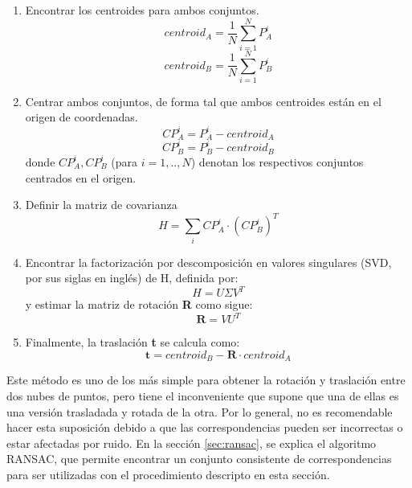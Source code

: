 \begin{enumerate}

\item Encontrar los centroides para ambos conjuntos.
\begin{equation}
centroid_{A} = \frac{1}{N} \sum_{i = 1}^{N} P_{A}^{i}
\end{equation}
\begin{equation}
centroid_{B} = \frac{1}{N} \sum_{i = 1}^{N} P_{B}^{i}
\end{equation}

\item Centrar ambos conjuntos, de forma tal que ambos centroides están en el origen de coordenadas.
\begin{equation}
CP_{A}^{i} = P_{A}^{i} - centroid_{A}
\end{equation}
\begin{equation}
CP_{B}^{i} = P_{B}^{i} - centroid_{B}
\end{equation}
donde $CP_{A}^{i}, CP_{B}^{i}$ (para $i=1,..,N$) denotan los respectivos conjuntos centrados en el origen.

\item Definir la matriz de covarianza
\begin{equation}
H = \sum_{i} CP_{A}^{i} \cdot (CP_{B}^{i})^{T}
\end{equation}

\item Encontrar la factorización por descomposición en valores singulares (SVD, por sus siglas en inglés) \cite{wiki-svd} de H, definida por:
\begin{equation}
H = U \Sigma V^{T}
\end{equation}
y estimar la matriz de rotación \textbf{R} como sigue:
\begin{equation}
\textbf{R} = V U^{T}
\end{equation}

\item Finalmente, la traslación \textbf{t} se calcula como:
\begin{equation}
\textbf{t} = centroid_{B} - \textbf{R} \cdot centroid_{A}
\end{equation}

\end{enumerate}

Este método es uno de los más simple para obtener la rotación y traslación entre dos nubes de puntos, pero tiene el inconveniente que supone que una de ellas es una versión trasladada y rotada de la otra. Por lo general, no es recomendable hacer esta suposición debido a que las correspondencias pueden ser incorrectas o estar afectadas por ruido. En la sección \ref{sec:ransac}, se explica el algoritmo RANSAC, que permite encontrar un conjunto consistente de correspondencias para ser utilizadas con el procedimiento descripto en esta sección.


